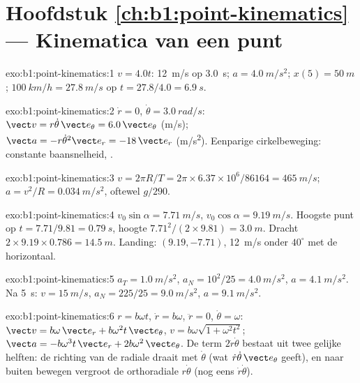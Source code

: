 \section*{Hoofdstuk \ref{ch:b1:point-kinematics} --- Kinematica van een punt}

\begin{solution}{exo:b1:point-kinematics:1}
$v = 4.0t$: \qty{12}{m/s} op \qty{3.0}{s}; $a = \qty{4.0}{m/s^2}$;
$x(5) = \qty{50}{m}$; $\qty{100}{km/h} = \qty{27.8}{m/s}$ op $t = 27.8/4.0
= \qty{6.9}{s}$.
\end{solution}

\begin{solution}{exo:b1:point-kinematics:2}
$\dot r = 0$, $\dot\theta = \qty{3.0}{rad/s}$: $\vect v = r\dot\theta\,\vect e_\theta
= 6.0\,\vect e_\theta$ (\unit{m/s}); $\vect a = -r\dot\theta^2\vect e_r =
-18\,\vect e_r$ (\unit{m/s^2}). Eenparige cirkelbeweging: constante baansnelheid,
.
\end{solution}

\begin{solution}{exo:b1:point-kinematics:3}
$v = 2\pi R/T = 2\pi \times 6.37\times10^6/86164 = \qty{465}{m/s}$;
$a = v^2/R = \qty{0.034}{m/s^2}$, oftewel $g/290$.
\end{solution}

\begin{solution}{exo:b1:point-kinematics:4}
$v_0\sin\alpha = \qty{7.71}{m/s}$, $v_0\cos\alpha = \qty{9.19}{m/s}$.
Hoogste punt op $t = 7.71/9.81 = \qty{0.79}{s}$, hoogte $7.71^2/(2 \times 9.81) =
\qty{3.0}{m}$. Dracht $2 \times 9.19 \times 0.786 = \qty{14.5}{m}$.
Landing: $(9.19, -7.71)$, \qty{12}{m/s} onder $40^\circ$ met de
horizontaal.
\end{solution}

\begin{solution}{exo:b1:point-kinematics:5}
$a_T = \qty{1.0}{m/s^2}$, $a_N = 10^2/25 = \qty{4.0}{m/s^2}$, $a =
\qty{4.1}{m/s^2}$. Na \qty{5}{s}: $v = \qty{15}{m/s}$, $a_N = 225/25 =
\qty{9.0}{m/s^2}$, $a = \qty{9.1}{m/s^2}$.
\end{solution}

\begin{solution}{exo:b1:point-kinematics:6}
$r = b\omega t$, $\dot r = b\omega$, $\ddot r = 0$, $\dot\theta = \omega$:
$\vect v = b\omega\,\vect e_r + b\omega^2 t\,\vect e_\theta$, $v = b\omega
\sqrt{1 + \omega^2t^2}$; $\vect a = -b\omega^3 t\,\vect e_r + 2b\omega^2\,
\vect e_\theta$. De term $2\dot r\dot\theta$ bestaat uit twee gelijke helften: de
richting van de radiale  draait met  $\dot\theta$ (wat
$\dot r\dot\theta\,\vect e_\theta$ geeft), en naar buiten bewegen vergroot de
orthoradiale  $r\dot\theta$ (nog eens $\dot r\dot\theta$).
\end{solution}

